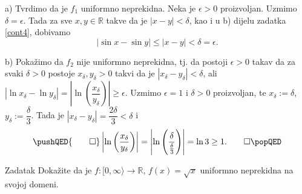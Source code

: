 \begin{proof*}
a) Tvrdimo da je \(f_1\) uniformno neprekidna. Neka je \(\epsilon>0\) proizvoljan. Uzmimo \(\delta=\epsilon\). Tada za sve \(x, y\in \mathbb{R}\) takve da je \(|x-y|<\delta\), kao i u b) dijelu zadatka \ref{cont4}, dobivamo
\[\left\lvert\sin{x}-\sin{y}\right\rvert\leq|x-y|<\delta=\epsilon.\]

b) Pokažimo da \(f_2\) nije uniformno neprekidna, tj. da postoji \(\epsilon>0\) takav da za svaki \(\delta>0\) postoje \(x_\delta, y_\delta>0\) takvi da je \(|x_\delta-y_\delta|<\delta\), ali \(\left\lvert\ln{x_\delta}-\ln{y_\delta}\right\rvert=\left\lvert\ln\left(\dfrac{x_\delta}{y_\delta}\right)\right\rvert\geq\epsilon\). Uzmimo \(\epsilon=1\) i \(\delta>0\) proizvoljan, te \(x_\delta:=\delta\), \(y_\delta:=\dfrac{\delta}{3}\). Tada je \(|x_\delta-y_\delta|=\dfrac{2\delta}{3}<\delta\) i
\[
\pushQED{\qed}
\left\lvert\ln\left(\dfrac{x_\delta}{y_\delta}\right)\right\rvert=\left\lvert\ln\left(\dfrac{\delta}{\frac{\delta}{3}}\right)\right\rvert=\ln{3}\geq 1.\qedhere
\popQED
\]
\end{proof*}
\begin{exercise}{Zadatak}
\label{sqrtunif}
Dokažite da je \(f : [0,\infty\rangle\to \mathbb{R}\), \(f(x)=\sqrt{x}\) uniformno neprekidna na svojoj domeni. 
\end{exercise}
